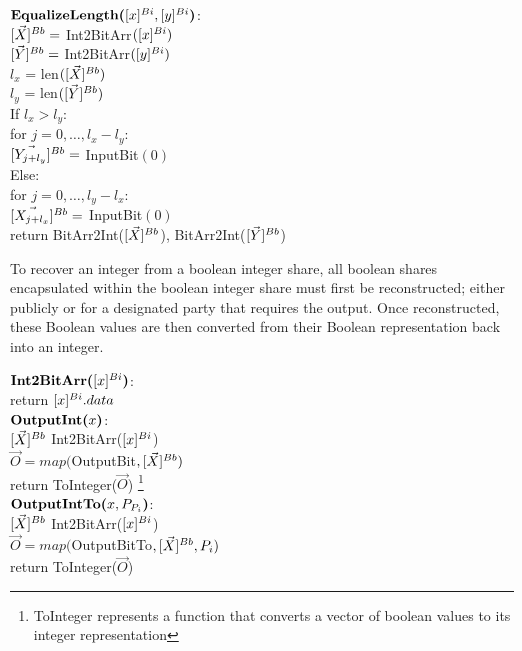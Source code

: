 \begin{protocol}
	\noindent
	$\textbf{EqualizeLength(}[x]^{Bi}, [y]^{Bi}\textbf{)}$:\\
	\indent $[\vec{X}]^{Bb} = $ Int2BitArr$([x]^{Bi})$ \\
	\indent $[\vec{Y}]^{Bb} = $ Int2BitArr$([y]^{Bi})$ \\
	\indent $l_x$ = len$([\vec{X}]^{Bb})$ \\
	\indent $l_y$ = len$([\vec{Y}]^{Bb})$ \\
	\indent If $l_x > l_y$:\\
	\indent \indent for $j = 0, \ldots, l_x-l_y$:\\
	\indent \indent \indent $[\vec{Y_{j+l_y}}]^{Bb} = $ InputBit$(0)$ \\
	\indent Else:\\
	\indent \indent for $j = 0, \ldots, l_y-l_x$:\\
	\indent \indent \indent $[\vec{X_{j+l_x}}]^{Bb} = $ InputBit$(0)$ \\
	\indent return BitArr2Int($[\vec{X}]^{Bb}$), BitArr2Int($[\vec{Y}]^{Bb}$)
	
\end{protocol}

To recover an integer from a boolean integer share, all boolean shares encapsulated within the boolean integer share must first be reconstructed; either publicly or for a designated party that requires the output. Once reconstructed, these Boolean values are then converted from their Boolean representation back into an integer.


\begin{protocol}
	
	$\textbf{Int2BitArr(}[x]^{Bi}\textbf{)}$:\\
	\indent return $[x]^{Bi}.data$\\
	
	\noindent
	$\textbf{OutputInt(}x\textbf{)}$:\\
	\indent $[\vec{X}]^{Bb}$ Int2BitArr($[x]^{Bi}$)\\
	\indent $\vec{O} = map($OutputBit$,[\vec{X}]^{Bb})$ \\
	\indent return ToInteger($\vec{O}$) \footnote{ToInteger represents a function that converts a vector of boolean values to its integer representation}\\
	
	\noindent
	$\textbf{OutputIntTo(}x, P_{P_i}\textbf{)}$:\\
	\indent $[\vec{X}]^{Bb}$ Int2BitArr($[x]^{Bi}$) \\
	\indent $\vec{O} = map($OutputBitTo$,[\vec{X}]^{Bb}, P_i)$ \\
	\indent return ToInteger($\vec{O}$)
	
\end{protocol}


